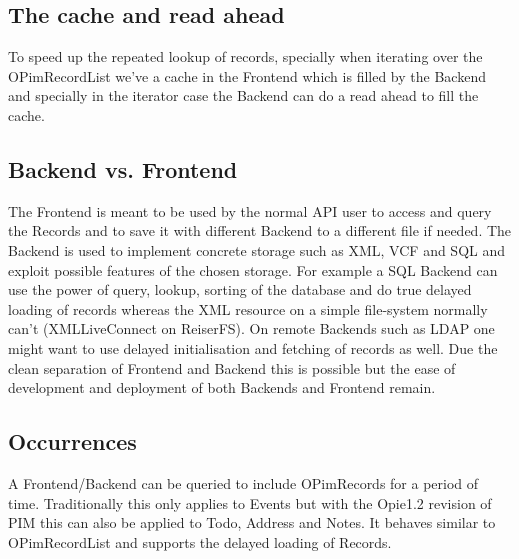 \subsection{The cache and read ahead}
To speed up the repeated lookup of records, specially when iterating
over the OPimRecordList we've a cache in the Frontend which is filled
by the Backend and specially in the iterator case the Backend
can do a read ahead to fill the cache.

\subsection{Backend vs. Frontend}
The Frontend is meant to be used by the normal API user to access
and query the Records and to save it with  different Backend to
a different file if needed.
The Backend is used to implement concrete storage such as XML, VCF
and SQL and exploit possible features of the chosen storage. For example
a SQL  Backend can use the power of query, lookup, sorting of the database
and do true delayed loading of records whereas the XML resource on
a simple file-system normally can't (XMLLiveConnect on ReiserFS). On remote
Backends such as LDAP one might want to use delayed initialisation and
fetching of records as well. Due the clean separation of Frontend and Backend
this is possible but the ease of development and deployment 
of both Backends and Frontend remain.

\subsection{Occurrences}
A Frontend/Backend can be queried to include OPimRecords for a 
period of time. Traditionally this only applies to Events but 
with the Opie1.2 revision of PIM this can also be applied to
Todo, Address and Notes.
It behaves similar to OPimRecordList and supports the delayed
loading of Records.
 
